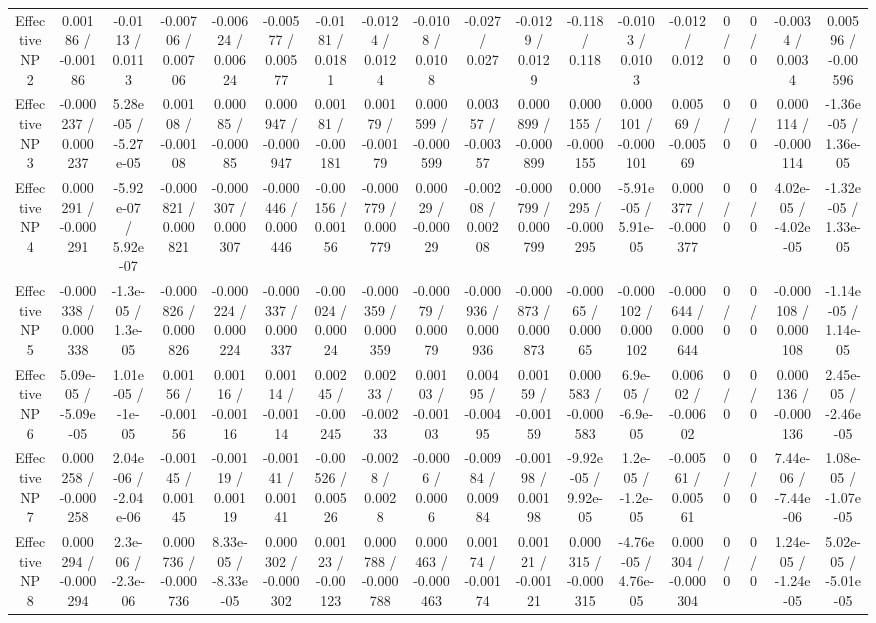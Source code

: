 \documentclass[10pt]{article}
\begin{document}
\begin{table}[htbp]
\begin{center}
\begin{tabular}{|c|c|c|c|c|c|c|c|c|c|c|c|c|c|c|c|c|c|}
  Effective NP 2 & 0.00186 / -0.00186 & -0.0113 / 0.0113 & -0.00706 / 0.00706 & -0.00624 / 0.00624 & -0.00577 / 0.00577 & -0.0181 / 0.0181 & -0.0124 / 0.0124 & -0.0108 / 0.0108 & -0.027 / 0.027 & -0.0129 / 0.0129 & -0.118 / 0.118 & -0.0103 / 0.0103 & -0.012 / 0.012 & 0 / 0 & 0 / 0 & -0.0034 / 0.0034 & 0.00596 / -0.00596 \\ 
  Effective NP 3 & -0.000237 / 0.000237 & 5.28e-05 / -5.27e-05 & 0.00108 / -0.00108 & 0.00085 / -0.00085 & 0.000947 / -0.000947 & 0.00181 / -0.00181 & 0.00179 / -0.00179 & 0.000599 / -0.000599 & 0.00357 / -0.00357 & 0.000899 / -0.000899 & 0.000155 / -0.000155 & 0.000101 / -0.000101 & 0.00569 / -0.00569 & 0 / 0 & 0 / 0 & 0.000114 / -0.000114 & -1.36e-05 / 1.36e-05 \\ 
  Effective NP 4 & 0.000291 / -0.000291 & -5.92e-07 / 5.92e-07 & -0.000821 / 0.000821 & -0.000307 / 0.000307 & -0.000446 / 0.000446 & -0.00156 / 0.00156 & -0.000779 / 0.000779 & 0.00029 / -0.00029 & -0.00208 / 0.00208 & -0.000799 / 0.000799 & 0.000295 / -0.000295 & -5.91e-05 / 5.91e-05 & 0.000377 / -0.000377 & 0 / 0 & 0 / 0 & 4.02e-05 / -4.02e-05 & -1.32e-05 / 1.33e-05 \\ 
  Effective NP 5 & -0.000338 / 0.000338 & -1.3e-05 / 1.3e-05 & -0.000826 / 0.000826 & -0.000224 / 0.000224 & -0.000337 / 0.000337 & -0.00024 / 0.00024 & -0.000359 / 0.000359 & -0.00079 / 0.00079 & -0.000936 / 0.000936 & -0.000873 / 0.000873 & -0.00065 / 0.00065 & -0.000102 / 0.000102 & -0.000644 / 0.000644 & 0 / 0 & 0 / 0 & -0.000108 / 0.000108 & -1.14e-05 / 1.14e-05 \\ 
  Effective NP 6 & 5.09e-05 / -5.09e-05 & 1.01e-05 / -1e-05 & 0.00156 / -0.00156 & 0.00116 / -0.00116 & 0.00114 / -0.00114 & 0.00245 / -0.00245 & 0.00233 / -0.00233 & 0.00103 / -0.00103 & 0.00495 / -0.00495 & 0.00159 / -0.00159 & 0.000583 / -0.000583 & 6.9e-05 / -6.9e-05 & 0.00602 / -0.00602 & 0 / 0 & 0 / 0 & 0.000136 / -0.000136 & 2.45e-05 / -2.46e-05 \\ 
  Effective NP 7 & 0.000258 / -0.000258 & 2.04e-06 / -2.04e-06 & -0.00145 / 0.00145 & -0.00119 / 0.00119 & -0.00141 / 0.00141 & -0.00526 / 0.00526 & -0.0028 / 0.0028 & -0.0006 / 0.0006 & -0.00984 / 0.00984 & -0.00198 / 0.00198 & -9.92e-05 / 9.92e-05 & 1.2e-05 / -1.2e-05 & -0.00561 / 0.00561 & 0 / 0 & 0 / 0 & 7.44e-06 / -7.44e-06 & 1.08e-05 / -1.07e-05 \\ 
  Effective NP 8 & 0.000294 / -0.000294 & 2.3e-06 / -2.3e-06 & 0.000736 / -0.000736 & 8.33e-05 / -8.33e-05 & 0.000302 / -0.000302 & 0.00123 / -0.00123 & 0.000788 / -0.000788 & 0.000463 / -0.000463 & 0.00174 / -0.00174 & 0.00121 / -0.00121 & 0.000315 / -0.000315 & -4.76e-05 / 4.76e-05 & 0.000304 / -0.000304 & 0 / 0 & 0 / 0 & 1.24e-05 / -1.24e-05 & 5.02e-05 / -5.01e-05 \\ 

\end{tabular}
\end{center}
\end{table}
\end{document}

